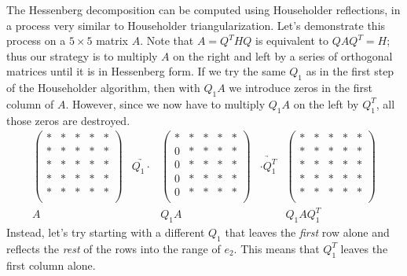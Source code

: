 The Hessenberg decomposition can be computed using Householder reflections, in a process very similar to Householder triangularization. Let's demonstrate this process on a $5 \times 5$ matrix $A$. Note that $A=Q^THQ$ is equivalent to $QAQ^T = H$; thus our strategy is to multiply $A$ on the right and left by a series of orthogonal matrices until it is in Hessenberg form. If we try the same $Q_1$ as in the first step of the Householder algorithm, then with $Q_1 A$ we introduce zeros in the first column of $A$. However, since we now have to multiply $Q_1 A$ on the left by $Q_1^T$, all those zeros are destroyed.
\[
\begin{array}{ccccc} 
\begin{pmatrix}
* & * & * & * & *\\
* & * & * & * & *\\
* & * & * & * & *\\
* & * & * & * & *\\
* & * & * & * & *\\
\end{pmatrix} 
&\underrightarrow{Q_1 \cdot }&
\begin{pmatrix}
* & * & * & * & *\\
0 & * & * & * & *\\
0 & * & * & * & *\\
0 & * & * & * & *\\
0 & * & * & * & *\\
\end{pmatrix} 
&\underrightarrow{\cdot Q_1^T }&
\begin{pmatrix}
* & * & * & * & *\\
* & * & * & * & *\\
* & * & * & * & *\\
* & * & * & * & *\\
* & * & * & * & *\\
\end{pmatrix} 
\\ 
A & & Q_1A & & Q_1 A Q_1^T
  \end{array}
\]
Instead, let's try starting with a different $Q_1$ that leaves the \emph{first} row alone and reflects the \emph{rest} of the rows into the range of $e_2$. This means that $Q_1^T$ leaves the first column alone.
